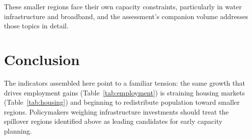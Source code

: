 \documentclass[11pt]{article}
\begin{document}
These smaller regions face their own capacity constraints, particularly in
water infrastructure and broadband, and the assessment's companion volume
addresses those topics in detail.

\section{Conclusion}

The indicators assembled here point to a familiar tension: the same growth
that drives employment gains (Table~\ref{tab:employment}) is straining housing
markets (Table~\ref{tab:housing}) and beginning to redistribute population
toward smaller regions. Policymakers weighing infrastructure investments
should treat the spillover regions identified above as leading candidates for
early capacity planning.
\end{document}
